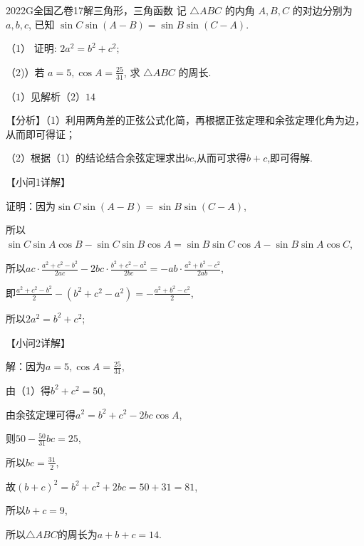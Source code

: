 \documentclass[12pt,UTF-8,a4paper]{ctexart}
\numberwithin{figure}{section}
\theoremstyle{mystyle}
\theoremstyle{mystylekaishu}
\theoremstyle{mystyle}
\numberwithin{xiti}{section}
\begin{document}

\begin{problem}{2022}{G}{全国乙卷}{17}{解三角形，三角函数}
记 $\triangle ABC$ 的内角 $A,B,C$ 的对边分别为 $a,b,c$, 已知 $\sin C\sin(A-B)=\sin B\sin(C-A)$.

（1） 证明: $2a^2=b^2+c^2$;

（2)）若 $a=5, \cos A=\frac{25}{31}$, 求 $\triangle ABC$ 的周长.
\end{problem}

\begin{answer}
$（1）见解析
（2）14$
\end{answer}

\begin{solutions}
【分析】（1）利用两角差的正弦公式化简，再根据正弦定理和余弦定理化角为边，从而即可得证；

（2）根据（1）的结论结合余弦定理求出$bc$,从而可求得$b+c$,即可得解.

【小问1详解】

证明：因为$\sin C\sin(A-B)=\sin B\sin(C-A)$,

所以$\sin C\sin A\cos B-\sin C\sin B\cos A=\sin B\sin C\cos A-\sin B\sin A\cos C$,

所以$ac\cdot\frac{a^2+c^2-b^2}{2ac}-2bc\cdot\frac{b^2+c^2-a^2}{2bc}=-ab\cdot\frac{a^2+b^2-c^2}{2ab}$,

即$\frac{a^2+c^2-b^2}{2}-\left(b^2+c^2-a^2\right)=-\frac{a^2+b^2-c^2}{2}$,

所以$2a^2=b^2+c^2$;

【小问2详解】

解：因为$a=5,\cos A=\frac{25}{31}$,

由（1）得$b^2+c^2=50$,

由余弦定理可得$a^2=b^2+c^2-2bc\cos A$,

则$50-\frac{50}{31}bc=25$,

所以$bc=\frac{31}{2}$,

故$(b+c)^2=b^2+c^2+2bc=50+31=81$,

所以$b+c=9$,

所以$\triangle ABC$的周长为$a+b+c=14$.
\end{solutions}

\end{document}
